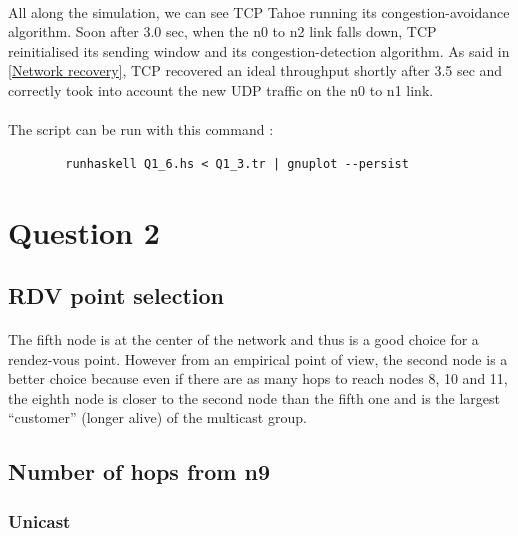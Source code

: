 \documentclass[a4paper]{article}
\begin{document}
    \paragraph{}All along the simulation, we can see TCP Tahoe running its
congestion-avoidance algorithm. \newline
Soon after 3.0 sec, when the n0 to n2 link falls down, TCP reinitialised its
sending window and its congestion-detection algorithm. As said in
\ref{Network recovery}, TCP recovered an ideal throughput shortly after 3.5 sec
and correctly took into account the new UDP traffic on the n0 to n1 link.

    \paragraph{}The script can be run with this command :
    \begin{verbatim}
        runhaskell Q1_6.hs < Q1_3.tr | gnuplot --persist
    \end{verbatim}

  \section{Question 2}

    \subsection{RDV point selection}

    \paragraph{}The fifth node is at the center of the network and thus is a
good choice for a rendez-vous point.
However from an empirical point of view, the second node is a better choice
because even if there are as many hops to reach nodes 8, 10 and 11, the eighth
node is closer to the second node than the fifth one and is the largest
\enquote{customer} (longer alive) of the multicast group.

  \subsection{Number of hops from n9}

   \subsubsection{Unicast}
\end{document}
